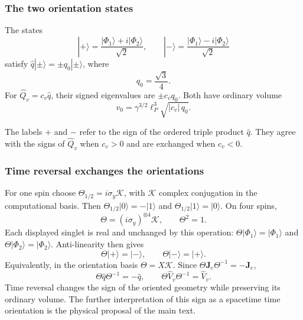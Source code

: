 \subsubsection{The two orientation states}

\begin{result}\label{res:volume}
 The states
 \begin{equation}
 |+\rangle=\frac{|\Phi_1\rangle+i|\Phi_2\rangle}{\sqrt2},\qquad
 |-\rangle=\frac{|\Phi_1\rangle-i|\Phi_2\rangle}{\sqrt2}
 \end{equation}
 satisfy $\hat q|\pm\rangle=\pm q_0|\pm\rangle$, where
 \begin{equation}\label{eqn:q0}
 q_0=\frac{\sqrt3}{4}.
 \end{equation}
 For $\hat Q_v=c_v\hat q$, their signed eigenvalues are $\pm c_vq_0$.
 Both have ordinary volume
 \begin{equation}\label{eqn:volume-eigenvalue}
 v_0=\gamma^{3/2}\ell_P^3\sqrt{|c_v|\,q_0}.
 \end{equation}
\end{result}
The labels $+$ and $-$ refer to the sign of the ordered triple product
$\hat q$. They agree with the signs of $\hat Q_v$ when $c_v>0$ and are
exchanged when $c_v<0$.

\subsubsection{Time reversal exchanges the orientations}

For one spin choose $\Theta_{1/2}=i\sigma_y\mathcal K$, with $\mathcal K$
complex conjugation in the computational basis. Then
$\Theta_{1/2}|0\rangle=-|1\rangle$ and
$\Theta_{1/2}|1\rangle=|0\rangle$. On four spins,
\begin{equation}
 \Theta=(i\sigma_y)^{\otimes4}\mathcal K,\qquad \Theta^2=1.
\end{equation}
Each displayed singlet is real and unchanged by this operation:
$\Theta|\Phi_1\rangle=|\Phi_1\rangle$ and
$\Theta|\Phi_2\rangle=|\Phi_2\rangle$.
Anti-linearity then gives
\begin{equation}
 \Theta|+\rangle=|-\rangle,\qquad\Theta|-\rangle=|+\rangle.
\end{equation}
Equivalently, in the orientation basis $\Theta=X\mathcal K$.
Since $\Theta\mathbf J_e\Theta^{-1}=-\mathbf J_e$,
\begin{equation}
 \Theta\hat q\Theta^{-1}=-\hat q,\qquad
 \Theta\hat V_v\Theta^{-1}=\hat V_v.
\end{equation}
Time reversal changes the sign of the oriented geometry while preserving
its ordinary volume. The further interpretation of this sign as a
spacetime time orientation is the physical proposal of the main text.

\GPTEnd{}
